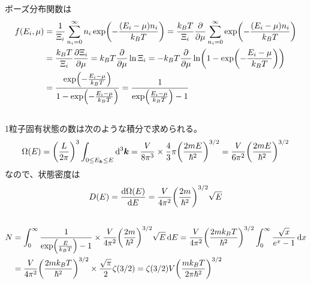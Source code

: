 \documentclass[../../sp_2021.tex]{subfiles}
\begin{document}
ボーズ分布関数は
\begin{equation}\begin{aligned}[b]
    f(E_i,\mu)&=\frac{1}{\Xi_i}\sum_{n_i=0}^{\infty}n_i\exp(-\frac{(E_i-\mu)n_i}{k_BT})
        =\frac{k_BT}{\Xi_i}\pdv{\mu}\sum_{n_i=0}^{\infty}\exp(-\frac{(E_i-\mu)n_i}{k_BT})\\
    &=\frac{k_BT}{\Xi_i}\pdv{\Xi_i}{\mu}
        =k_BT\pdv{\mu}\ln\Xi_i
        = -k_BT\pdv{\mu}\ln(1-\exp(-\frac{E_i-\mu}{k_BT}))\\
    &= \frac{\exp(-\frac{E_i-\mu}{k_BT})}{1-\exp(-\frac{E_i-\mu}{k_BT})}
        =\frac{1}{\exp(\frac{E_i-\mu}{k_BT})-1}
\end{aligned}\end{equation}

\subsection{}
1粒子固有状態の数は次のような積分で求められる。
\begin{equation}\begin{aligned}[b]
    \Omega(E) = \qty(\frac{L}{2\pi})^3\int_{0\leq E_{\vb*{k}}\leq E}\dd[3]{\vb*{k}}
        = \frac{V}{8\pi^3}\times \frac{4}{3}\pi\qty(\frac{2mE}{\hbar^2})^{3/2}
        = \frac{V}{6\pi^2}\qty(\frac{2mE}{\hbar^2})^{3/2}
\end{aligned}\end{equation}
なので、状態密度は
\begin{equation}\begin{aligned}[b]
    D(E)=\dv{\Omega(E)}{E} = \frac{V}{4\pi^2}\qty(\frac{2m}{\hbar^2})^{3/2}\sqrt{E}
\end{aligned}\end{equation}

\subsection{}
\begin{equation}\begin{aligned}[b]
    N &= \int_{0}^{\infty}\frac{1}{\exp(\frac{E}{k_BT})-1}\times \frac{V}{4\pi^2}\qty(\frac{2m}{\hbar^2})^{3/2}\sqrt{E} \dd{E}
        = \frac{V}{4\pi^2}\qty(\frac{2mk_BT}{\hbar^2})^{3/2}\int_{0}^{\infty}\frac{\sqrt{x}}{e^x-1}\dd{x}\\
    &= \frac{V}{4\pi^2}\qty(\frac{2mk_BT}{\hbar^2})^{3/2}\times \frac{\sqrt{\pi}}{2}\zeta(3/2)
    = \zeta(3/2)V\qty(\frac{mk_BT}{2\pi\hbar^2})^{3/2}
\end{aligned}\end{equation}
\end{document}
